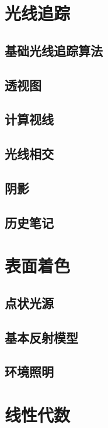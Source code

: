 \documentclass[lang=cn,12pt]{elegantbook}
\begin{document}
\chapter{光线追踪}

\section{基础光线追踪算法}

\section{透视图}

\section{计算视线}

\section{光线相交}

\section{阴影}

\section{历史笔记}

\chapter{表面着色}

\section{点状光源}


\section{基本反射模型}


\section{环境照明}

\chapter{线性代数}
\end{document}

